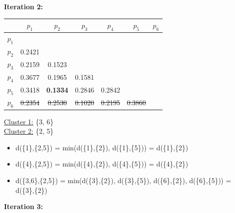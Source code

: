 \documentclass[11pt]{article}
\begin{document}
	
	\textbf{Iteration 2:}
	
	\begin{center}
    	\begin{adjustbox}{max width=\textwidth}
		\begin{tabular}{ | c | c | c | c | c | c | c |}
	  	 	\hline

	  	 	& \textbf{$p_1$} & \textbf{$p_2$} & \textbf{$p_3$} & \textbf{$p_4$} & \textbf{$p_5$} & \textbf{$p_6$}\\
	  	 	\hline
	  	 	
	  	 	\textbf{$p_1$} &  &  &  &  &  &\\
	  	 	\hline
	  	 	
	  	 	\textbf{$p_2$} & 0.2421 &  &  &  &  &  \\
	  	 	\hline
	  	 	
	  	 	\textbf{$p_3$} & 0.2159 & 0.1523 &  &  &  & \\
	  	 	\hline
	  	 	
	  	 	\textbf{$p_4$} & 0.3677 & 0.1965 & 0.1581 &  &  & \\
	  	 	\hline
	  	 	
	  	 	\textbf{$p_5$} & 0.3418 & \textbf{0.1334} & 0.2846 & 0.2842 &  & \\
	  	 	\hline	
	  	 	
	  	 	\textbf{$p_6$} & \st{0.2354} & \st{0.2530} & \st{0.1020} & \st{0.2195} & \st{0.3860} & \\
	  	 	\hline			
    		\end{tabular}
    	\end{adjustbox}
	\end{center}
	
	\underline{Cluster 1:} \{3, 6\} \\
	\underline{Cluster 2:} \{2, 5\}
	
	\begin{itemize}
		\item d(\{1\},\{2,5\}) = min(d(\{1\},\{2\}), d(\{1\},\{5\})) = d(\{1\},\{2\})
		\item d(\{4\},\{2,5\}) = min(d(\{4\},\{2\}), d(\{4\},\{5\})) = d(\{4\},\{2\})
		\item d(\{3,6\},\{2,5\}) = min(d(\{3\},\{2\}), d(\{3\},\{5\}), d(\{6\},\{2\}), d(\{6\},\{5\})) = d(\{3\},\{2\})
	\end{itemize}
	
	\textbf{Iteration 3:}
	
\end{document}
